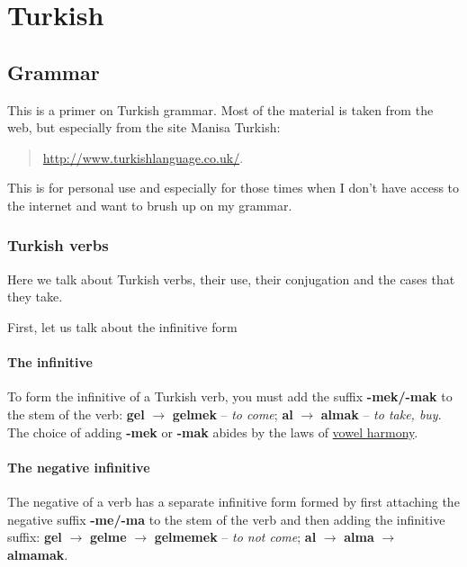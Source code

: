 \chapter{Turkish}
\section{Grammar}
This is a primer on Turkish grammar. Most of the material is taken from the
web, but especially from the site \textsf{Manisa Turkish}:
\begin{quote}
  \url{http://www.turkishlanguage.co.uk/}.
\end{quote}
This is for personal use and especially for those times when I don't have
access to the internet and want to brush up on my grammar.

\subsection{Turkish verbs}
Here we talk about Turkish verbs, their use, their conjugation and the
cases that they take.

First, let us talk about the infinitive form
\subsubsection{The infinitive}
To form the infinitive of a Turkish verb, you must add the suffix
\textbf{-mek/-mak} to the stem of the verb: \textbf{gel} \(\to\)
\textbf{gelmek} -- \emph{to come}; \textbf{al} \(\to\) \textbf{almak} --
\emph{to take, buy}. The choice of adding \textbf{-mek} or \textbf{-mak}
abides by the laws of
\href{https://en.wikipedia.org/wiki/Vowel_harmony}{vowel harmony}.

\subsubsection{The negative infinitive}
The negative of a verb has a separate infinitive form formed by first
attaching the negative suffix \textbf{-me/-ma} to the stem of the verb and
then adding the infinitive suffix: \textbf{gel} \(\to\) \textbf{gelme}
\(\to\) \textbf{gelmemek} -- \emph{to not come}; \textbf{al} \(\to\)
\textbf{alma} \(\to\) \textbf{almamak}.

